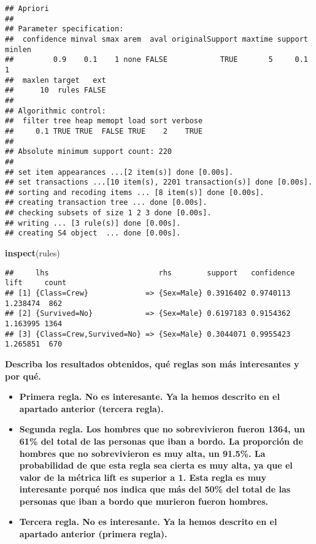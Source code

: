 \documentclass[]{article}
\newenvironment{Shaded}{\begin{snugshade}}{\end{snugshade}}
\newcommand{\KeywordTok}[1]{\textcolor[rgb]{0.13,0.29,0.53}{\textbf{#1}}}
\newcommand{\NormalTok}[1]{#1}
\begin{document}
\begin{verbatim}
## Apriori
## 
## Parameter specification:
##  confidence minval smax arem  aval originalSupport maxtime support minlen
##         0.9    0.1    1 none FALSE            TRUE       5     0.1      1
##  maxlen target   ext
##      10  rules FALSE
## 
## Algorithmic control:
##  filter tree heap memopt load sort verbose
##     0.1 TRUE TRUE  FALSE TRUE    2    TRUE
## 
## Absolute minimum support count: 220 
## 
## set item appearances ...[2 item(s)] done [0.00s].
## set transactions ...[10 item(s), 2201 transaction(s)] done [0.00s].
## sorting and recoding items ... [8 item(s)] done [0.00s].
## creating transaction tree ... done [0.00s].
## checking subsets of size 1 2 3 done [0.00s].
## writing ... [3 rule(s)] done [0.00s].
## creating S4 object  ... done [0.00s].
\end{verbatim}

\begin{Shaded}
\begin{Highlighting}[]
\KeywordTok{inspect}\NormalTok{(rules)}
\end{Highlighting}
\end{Shaded}

\begin{verbatim}
##     lhs                         rhs        support   confidence lift     count
## [1] {Class=Crew}             => {Sex=Male} 0.3916402 0.9740113  1.238474  862 
## [2] {Survived=No}            => {Sex=Male} 0.6197183 0.9154362  1.163995 1364 
## [3] {Class=Crew,Survived=No} => {Sex=Male} 0.3044071 0.9955423  1.265851  670
\end{verbatim}

\textbf{Describa los resultados obtenidos, qué reglas son más
interesantes y por qué.}

\begin{itemize}
\item
  \textbf{Primera regla. No es interesante. Ya la hemos descrito en el
  apartado anterior (tercera regla).}
\item
  \textbf{Segunda regla. Los hombres que no sobrevivieron fueron 1364,
  un 61\% del total de las personas que iban a bordo. La proporción de
  hombres que no sobrevivieron es muy alta, un 91.5\%. La probabilidad
  de que esta regla sea cierta es muy alta, ya que el valor de la
  métrica lift es superior a 1. Esta regla es muy interesante porqué nos
  indica que más del 50\% del total de las personas que iban a bordo que
  murieron fueron hombres.}

\newpage

\item
  \textbf{Tercera regla. No es interesante. Ya la hemos descrito en el
  apartado anterior (primera regla).}
\end{itemize}
\end{document}
